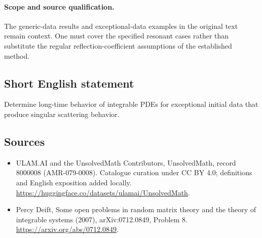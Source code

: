 \documentclass[11pt]{article}
\begin{document}
\paragraph{Scope and source qualification.}The generic-data results and exceptional-data examples in the original text remain context. One must cover the specified resonant cases rather than substitute the regular reflection-coefficient assumptions of the established method.
\subsection{Short English statement}
Determine long-time behavior of integrable PDEs for exceptional initial data that produce singular scattering behavior.
\subsection{Sources}
\begin{itemize}
\item[\hypertarget{source:8000008:1}{S1}] ULAM.AI and the UnsolvedMath Contributors, UnsolvedMath, record 8000008 (AMR-079-0008). Catalogue curation under CC BY 4.0; definitions and English exposition added locally.
\url{https://huggingface.co/datasets/ulamai/UnsolvedMath}.
\item[\hypertarget{source:8000008:2}{S2}] Percy Deift, Some open problems in random matrix theory and the theory of integrable systems (2007), arXiv:0712.0849, Problem 8.
\url{https://arxiv.org/abs/0712.0849}.
\end{itemize}
\label{end:8000008}
\end{document}
